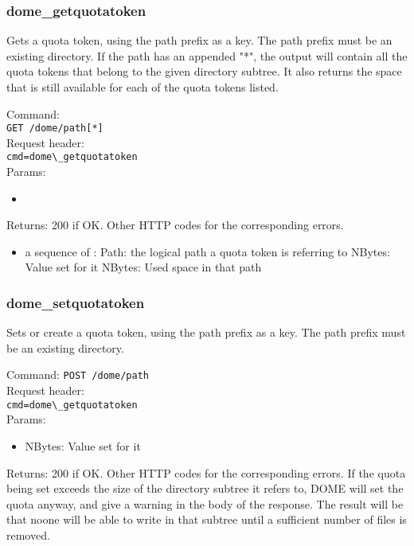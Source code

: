 \documentclass[a4paper,10pt]{scrreprt}
\begin{document}
\subsubsection{dome\_getquotatoken}
Gets a quota token, using the path prefix as a key. The path prefix must be an existing directory.
If the path has an appended "*", the output will contain all the quota tokens that belong to the given directory subtree.
It also returns the space that is still available for each of the quota tokens listed.

Command:\\
\lstinline"GET /dome/path[*]"\\
Request header:\\
\lstinline"cmd=dome\_getquotatoken"\\
Params:\\
\begin{itemize}
 \item
\end{itemize}

Returns: 200 if OK. Other HTTP codes for the corresponding errors.\\
\begin{itemize}
 \item a sequence of :
 \subitem Path: the logical path a quota token is referring to
 \subitem NBytes: Value set for it
 \subitem NBytes: Used space in that path
\end{itemize}

\subsubsection{dome\_setquotatoken}
Sets or create a quota token, using the path prefix as a key. The path prefix must be an existing directory.

Command:
\lstinline"POST /dome/path"\\
Request header:\\
\lstinline"cmd=dome\_getquotatoken"\\
Params:
\begin{itemize}
 \item NBytes: Value set for it
\end{itemize}

Returns: 200 if OK. Other HTTP codes for the corresponding errors. If the quota being set exceeds the size of the directory subtree it refers to, DOME will set the quota anyway, and give a warning in the body of the response. The result will be that noone will be able to write in that subtree until a sufficient number of files is removed.\\
\end{document}
